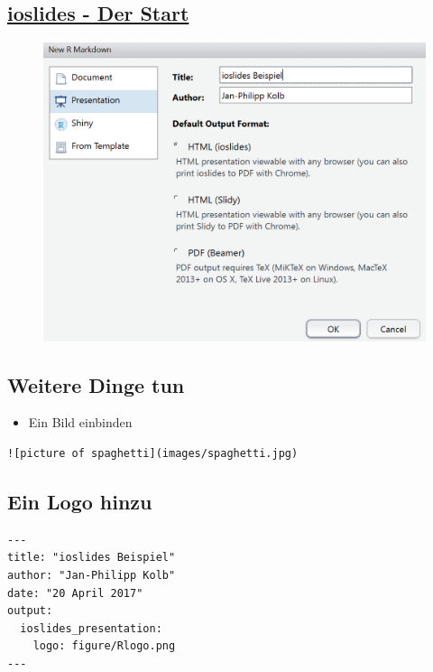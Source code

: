 \documentclass[]{article}
\providecommand{\tightlist}{%
  \setlength{\itemsep}{0pt}\setlength{\parskip}{0pt}}
\begin{document}
\subsection{\texorpdfstring{\href{http://rmarkdown.rstudio.com/ioslides_presentation_format.html}{\textbf{ioslides
- Der Start}}}{ioslides - Der Start}}\label{ioslides---der-start}

\begin{figure}
\centering
\includegraphics{figure/ioslidesBSP.PNG}
\caption{}
\end{figure}

\subsection{Weitere Dinge tun}\label{weitere-dinge-tun}

\begin{itemize}
\tightlist
\item
  Ein Bild einbinden
\end{itemize}

\begin{verbatim}
![picture of spaghetti](images/spaghetti.jpg)
\end{verbatim}

\subsection{Ein Logo hinzu}\label{ein-logo-hinzu}

\begin{verbatim}
---
title: "ioslides Beispiel"
author: "Jan-Philipp Kolb"
date: "20 April 2017"
output: 
  ioslides_presentation:
    logo: figure/Rlogo.png
---
\end{verbatim}
\end{document}

